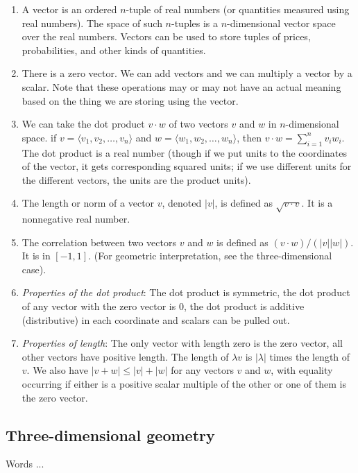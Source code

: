 \documentclass[10pt]{amsart}
\begin{document}
\begin{enumerate}
\item A vector is an ordered $n$-tuple of real numbers (or quantities
  measured using real numbers). The space of such $n$-tuples is a
  $n$-dimensional vector space over the real numbers. Vectors can be
  used to store tuples of prices, probabilities, and other kinds of
  quantities.
\item There is a zero vector. We can add vectors and we can multiply a
  vector by a scalar. Note that these operations may or may not have
  an actual meaning based on the thing we are storing using the vector.
\item We can take the dot product $v \cdot w$ of two vectors $v$ and
  $w$ in $n$-dimensional space. if $v = \langle v_1, v_2, \dots, v_n
  \rangle$ and $w = \langle w_1, w_2, \dots, w_n \rangle$, then $v
  \cdot w = \sum_{i=1}^n v_iw_i$. The dot product is a real number
  (though if we put units to the coordinates of the vector, it gets
  corresponding squared units; if we use different units for the
  different vectors, the units are the product units).
\item The length or norm of a vector $v$, denoted $|v|$, is defined as
  $\sqrt{v \cdot v}$. It is a nonnegative real number.
\item The correlation between two vectors $v$ and $w$ is defined as
  $(v \cdot w)/(|v||w|)$. It is in $[-1,1]$. (For geometric
  interpretation, see the three-dimensional case).
\item {\em Properties of the dot product}: The dot product is
  symmetric, the dot product of any vector with the zero vector is
  $0$, the dot product is additive (distributive) in each coordinate
  and scalars can be pulled out.
\item {\em Properties of length}: The only vector with length zero is
  the zero vector, all other vectors have positive length. The length
  of $\lambda v$ is $|\lambda|$ times the length of $v$. We also have
  $|v + w| \le |v| + |w|$ for any vectors $v$ and $w$, with equality
  occurring if either is a positive scalar multiple of the other or
  one of them is the zero vector.
\end{enumerate}

\subsection{Three-dimensional geometry}

Words ...
\end{document}
